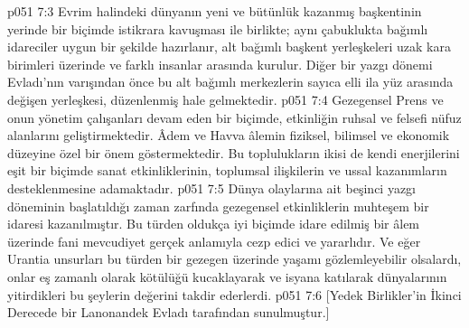 \vs p051 7:3 Evrim halindeki dünyanın yeni ve bütünlük kazanmış başkentinin yerinde bir biçimde istikrara kavuşması ile birlikte; aynı çabuklukta bağımlı idareciler uygun bir şekilde hazırlanır, alt bağımlı başkent yerleşkeleri uzak kara birimleri üzerinde ve farklı insanlar arasında kurulur. Diğer bir yazgı dönemi Evladı’nın varışından önce bu alt bağımlı merkezlerin sayıca elli ila yüz arasında değişen yerleşkesi, düzenlenmiş hale gelmektedir.
\vs p051 7:4 Gezegensel Prens ve onun yönetim çalışanları devam eden bir biçimde, etkinliğin ruhsal ve felsefi nüfuz alanlarını geliştirmektedir. Âdem ve Havva âlemin fiziksel, bilimsel ve ekonomik düzeyine özel bir önem göstermektedir. Bu toplulukların ikisi de kendi enerjilerini eşit bir biçimde sanat etkinliklerinin, toplumsal ilişkilerin ve ussal kazanımların desteklenmesine adamaktadır.
\vs p051 7:5 Dünya olaylarına ait beşinci yazgı döneminin başlatıldığı zaman zarfında gezegensel etkinliklerin muhteşem bir idaresi kazanılmıştır. Bu türden oldukça iyi biçimde idare edilmiş bir âlem üzerinde fani mevcudiyet gerçek anlamıyla cezp edici ve yararlıdır. Ve eğer Urantia unsurları bu türden bir gezegen üzerinde yaşamı gözlemleyebilir olsalardı, onlar eş zamanlı olarak kötülüğü kucaklayarak ve isyana katılarak dünyalarının yitirdikleri bu şeylerin değerini takdir ederlerdi.
\vs p051 7:6 [Yedek Birlikler’in İkinci Derecede bir Lanonandek Evladı tarafından sunulmuştur.]
